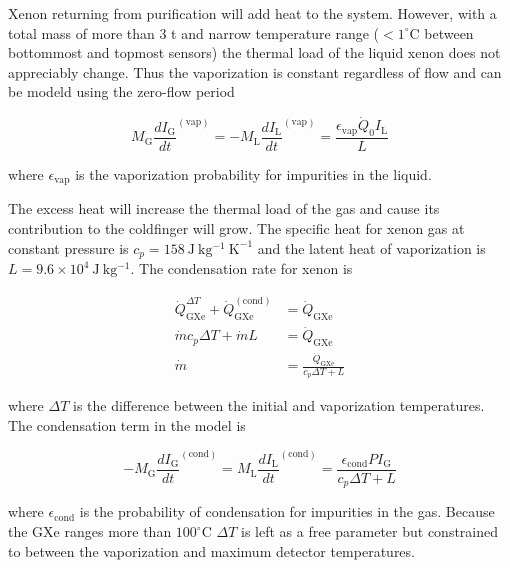 Xenon returning from purification will add heat to the system.  However, with a total mass of more than 3 t and
narrow temperature range ($< 1^{\circ}\mathrm{C}$ between bottommost and topmost sensors) the thermal load of the liquid xenon does not
appreciably change.  Thus the vaporization is constant regardless of flow and can be modeld using the zero-flow period

\begin{equation}
M_{\mathrm{G}} \frac{dI_{\mathrm{G}}}{dt}^{(\mathrm{vap})} = -M_{\mathrm{L}} \frac{dI_{\mathrm{L}}}{dt}^{(\mathrm{vap})} =
\frac{\epsilon_{\mathrm{vap}} \dot{Q}_0 I_{\mathrm{L}}}{L}
\end{equation}

\noindent where $\epsilon_{\mathrm{vap}}$ is the vaporization probability for impurities in the liquid.

The excess heat will increase the thermal load of the gas and cause its contribution to the coldfinger will grow.  The specific heat for
xenon gas at constant pressure is $c_p = 158\ \mathrm{J\ kg^{-1}\ K^{-1}}$ and the latent heat of vaporization is
$L = 9.6 \times 10^4\ \mathrm{J\ kg^{-1}}$.  The condensation rate for xenon is

\begin{equation}
\begin{aligned}
\dot{Q}_{\mathrm{GXe}}^{\Delta T} + \dot{Q}_{\mathrm{GXe}}^{(\mathrm{cond})} &= \dot{Q}_{\mathrm{GXe}} \\
\dot{m} c_p \Delta T + \dot{m} L &= \dot{Q}_{\mathrm{GXe}} \\
\dot{m} &= \frac{\dot{Q}_{\mathrm{GXe}}}{c_p \Delta T + L}
\end{aligned}
\end{equation}

\noindent where $\Delta T$ is the difference between the initial and vaporization temperatures.  The condensation term in the model is

\begin{equation}
-M_{\mathrm{G}} \frac{dI_{\mathrm{G}}}{dt}^{(\mathrm{cond})} = M_{\mathrm{L}} \frac{dI_{\mathrm{L}}}{dt}^{(\mathrm{cond})} =
\frac{\epsilon_{\mathrm{cond}} P I_{\mathrm{G}}}{c_p \Delta T + L}
\end{equation}

\noindent where $\epsilon_{\mathrm{cond}}$ is the probability of condensation for impurities in the gas.  Because the GXe ranges more
than $100^{\circ}\mathrm{C}$ $\Delta T$ is left as a free parameter but constrained to between the vaporization and maximum detector
temperatures.

